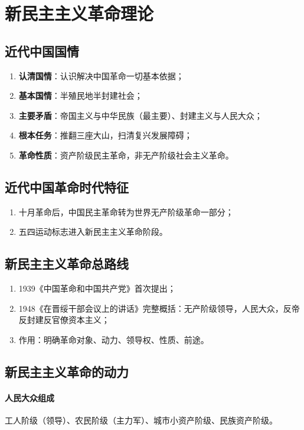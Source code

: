 \noparindent
\section{新民主主义革命理论}

\subsection{近代中国国情}
\begin{enumerate}
    \item \textbf{认清国情}：认识解决中国革命一切基本依据；
    \item \textbf{基本国情}：半殖民地半封建社会；
    \item \textbf{主要矛盾}：帝国主义与中华民族（最主要）、封建主义与人民大众；
    \item \textbf{根本任务}：推翻三座大山，扫清复兴发展障碍；
    \item \textbf{革命性质}：资产阶级民主革命，非无产阶级社会主义革命。
\end{enumerate}

\subsection{近代中国革命时代特征}
\begin{enumerate}
    \item 十月革命后，中国民主革命转为世界无产阶级革命一部分；
    \item 五四运动标志进入新民主主义革命阶段。
\end{enumerate}

\subsection{新民主主义革命总路线}
\begin{enumerate}
    \item 1939《中国革命和中国共产党》首次提出；
    \item 1948《在晋绥干部会议上的讲话》完整概括：无产阶级领导，人民大众，反帝反封建反官僚资本主义；
    \item 作用：明确革命对象、动力、领导权、性质、前途。
\end{enumerate}

\subsection{新民主主义革命的动力}
\paragraph{人民大众组成}工人阶级（领导）、农民阶级（主力军）、城市小资产阶级、民族资产阶级。

